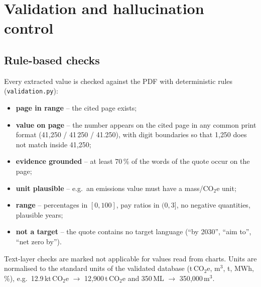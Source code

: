 \documentclass[11pt,a4paper]{article}
\newcommand{\code}[1]{\texttt{\small #1}}
\begin{document}
\section{Validation and hallucination control}\label{sec:validation}
\subsection{Rule-based checks}
Every extracted value is checked against the PDF with deterministic rules (\code{validation.py}):
\begin{itemize}
  \item \textbf{page in range} -- the cited page exists;
  \item \textbf{value on page} -- the number appears on the cited page in any common print format
        (41{,}250 / 41\,250 / 41.250), with digit boundaries so that 1{,}250 does not match inside 41{,}250;
  \item \textbf{evidence grounded} -- at least 70\,\% of the words of the quote occur on the page;
  \item \textbf{unit plausible} -- e.g.\ an emissions value must have a mass/CO$_2$e unit;
  \item \textbf{range} -- percentages in $[0,100]$, pay ratios in $(0,3]$, no negative quantities, plausible years;
  \item \textbf{not a target} -- the quote contains no target language (``by 2030'', ``aim to'', ``net zero by'').
\end{itemize}
Text-layer checks are marked not applicable for values read from charts. Units are normalised to the
standard units of the validated database (t\,CO$_2$e, m$^3$, t, MWh, \%), e.g.\ 12.9\,kt\,CO$_2$e $\rightarrow$
12{,}900\,t\,CO$_2$e and 350\,ML $\rightarrow$ 350{,}000\,m$^3$.
\end{document}
